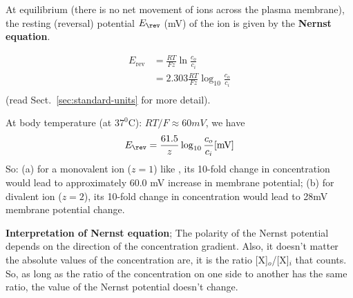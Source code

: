 At equilibrium (there is no net movement of ions across the plasma membrane),
the resting (reversal) potential $E_\rev$ (mV) of the ion is given by the {\bf
Nernst equation}.


\begin{equation}
    \label{eq:Nernst_equa}
    \begin{split}
      E_\text{rev} &= \frac{RT}{Fz} \ln \frac{c_o}{c_i} \\
      &= 2.303\frac{RT}{Fz} \log_{10} \frac{c_o}{c_i} \\
    \end{split}
\end{equation}
(read Sect.~\ref{sec:standard-units} for more detail).

At body temperature (at $37^0$C):
$RT/F \approx 60mV$, we have
\begin{equation}
E_\rev=\frac{61.5}{z}\log_{10}\frac{c_o}{c_i}\text{[mV]}
\end{equation}
So: (a) for a monovalent ion ($z=1$) like , its 10-fold change in
concentration would lead to approximately 60.0 mV increase in membrane
potential; (b) for divalent ion ($z=2$), its 10-fold change in concentration
would lead to 28mV membrane potential change.

  

{\bf  Interpretation of Nernst equation}; The polarity of the Nernst
potential depends on the direction of the concentration gradient. Also, it
doesn't matter the absolute values of the concentration are, it is the ratio
[X]$_o$/[X]$_i$ that counts. So, as long as the ratio of the concentration on
one side to another has the same ratio, the value of the Nernst potential
doesn't change.

